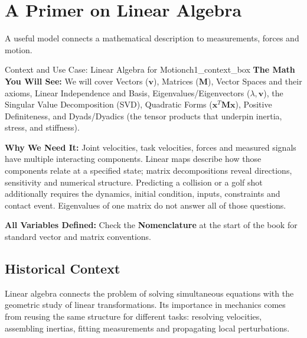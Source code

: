 \chapter{A Primer on Linear Algebra}
\label{ch:linear_algebra}

\epigraph{%
  A useful model connects a mathematical description to measurements, forces and motion.
}{}

\begin{laymansbox}{Context and Use Case: Linear Algebra for Motion}{ch1_context_box}
\textbf{The Math You Will See:} We will cover Vectors ($\mathbf{v}$), Matrices ($\mathbf{M}$), Vector Spaces and their axioms, Linear Independence and Basis, Eigenvalues/Eigenvectors ($\lambda, \mathbf{v}$), the Singular Value Decomposition (SVD), Quadratic Forms ($\mathbf{x}^T \mathbf{M} \mathbf{x}$), Positive Definiteness, and Dyads/Dyadics (the tensor products that underpin inertia, stress, and stiffness).

\textbf{Why We Need It:} Joint velocities, task velocities, forces and measured signals have multiple interacting components. Linear maps describe how those components relate at a specified state; matrix decompositions reveal directions, sensitivity and numerical structure. Predicting a collision or a golf shot additionally requires the dynamics, initial condition, inputs, constraints and contact event. Eigenvalues of one matrix do not answer all of those questions.

\textbf{All Variables Defined:} Check the \textbf{Nomenclature} at the start of the book for standard vector and matrix conventions.
\end{laymansbox}

\section{Historical Context}
\label{sec:la_history}

Linear algebra connects the problem of solving simultaneous equations with the geometric study of linear transformations. Its importance in mechanics comes from reusing the same structure for different tasks: resolving velocities, assembling inertias, fitting measurements and propagating local perturbations.

